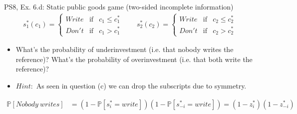 \begin{frame}{PS8, Ex. 6.d: Static public goods game (two-sided incomplete information)}
    \begin{align*}
      s_1^*(c_1)=\left\{\begin{array}{rcl}
        Write & \text{if} & c_1\leq c_1^*\\
        Don't & \text{if} & c_1>c_1^*
        \end{array}\right.\quad\quad
      s_2^*(c_2)=\left\{\begin{array}{rcl}
        Write & \text{if} & c_2\leq c_2^*\\
        Don't & \text{if} & c_2>c_2^*
        \end{array}\right.
    \end{align*}
    \vspace{-12pt}
    \begin{itemize}
      \item[(d)] What’s the probability of underinvestment (i.e. that nobody writes the reference)? What’s the probability of overinvestment (i.e. that both write the reference)?
      \item[]    $Hint:$ As seen in question (c) we can drop the subscripts due to symmetry.
    \end{itemize}
    \vspace{-8pt}
    \begin{align*}
      \mathbb{P}[Nobody\ writes]&=(1-\mathbb{P}[s_{i}^*=write])(1-\mathbb{P}[s_{-i}^*=write])=(1-z_{i}^*)(1-z_{-i}^*)
    \end{align*}
    \vfill\null
\end{frame}
